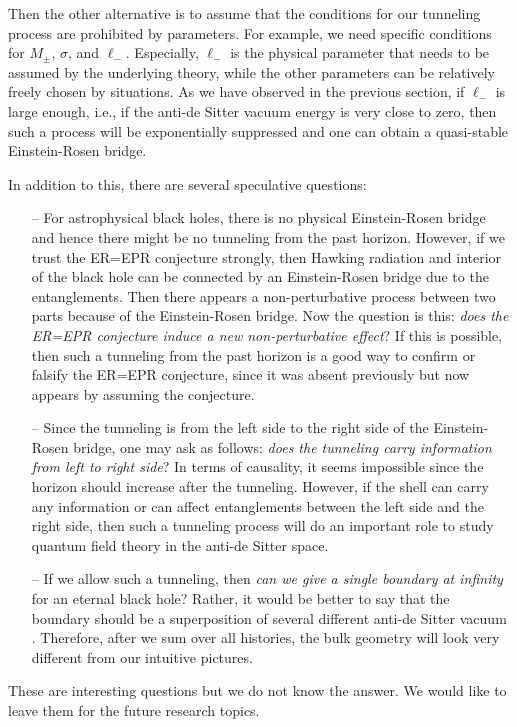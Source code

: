\documentclass[preprintnumbers,10pt,nofootinbib]{revtex4}
\begin{document}
Then the other alternative is to assume that the conditions for our tunneling process are prohibited by parameters. For example, we need specific conditions for $M_{\pm}$, $\sigma$, and $\ell_{-}$. Especially, $\ell_{-}$ is the physical parameter that needs to be assumed by the underlying theory, while the other parameters can be relatively freely chosen by situations. As we have observed in the previous section, if $\ell_{-}$ is large enough, i.e., if the anti-de Sitter vacuum energy is very close to zero, then such a process will be exponentially suppressed and one can obtain a quasi-stable Einstein-Rosen bridge.

In addition to this, there are several speculative questions:
\begin{itemize}
\item[--] For astrophysical black holes, there is no physical Einstein-Rosen bridge and hence there might be no tunneling from the past horizon. However, if we trust the ER=EPR conjecture strongly, then Hawking radiation and interior of the black hole can be connected by an Einstein-Rosen bridge due to the entanglements. Then there appears a non-perturbative process between two parts because of the Einstein-Rosen bridge. Now the question is this: \textit{does the ER=EPR conjecture induce a new non-perturbative effect}? If this is possible, then such a tunneling from the past horizon is a good way to confirm or falsify the ER=EPR conjecture, since it was absent previously but now appears by assuming the conjecture.
\item[--] Since the tunneling is from the left side to the right side of the Einstein-Rosen bridge, one may ask as follows: \textit{does the tunneling carry information from left to right side}? In terms of causality, it seems impossible since the horizon should increase after the tunneling. However, if the shell can carry any information or can affect entanglements between the left side and the right side, then such a tunneling process will do an important role to study quantum field theory in the anti-de Sitter space.
\item[--] If we allow such a tunneling, then \textit{can we give a single boundary at infinity} for an eternal black hole? Rather, it would be better to say that the boundary should be a superposition of several different anti-de Sitter vacuum \cite{Yeom:2016qec}. Therefore, after we sum over all histories, the bulk geometry will look very different from our intuitive pictures.
\end{itemize}
These are interesting questions but we do not know the answer. We would like to leave them for the future research topics.
\end{document}
